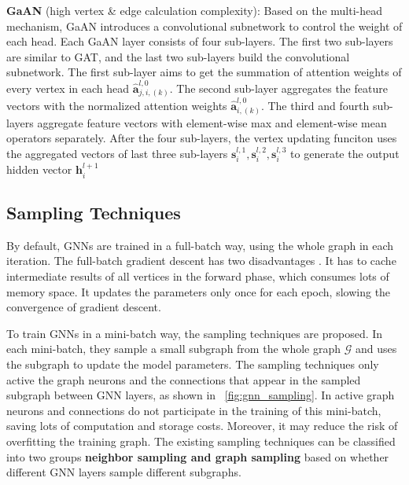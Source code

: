 \textbf{GaAN} (high vertex \& edge calculation complexity):
Based on the multi-head mechanism, GaAN \cite{zhang2018_gaan} introduces a convolutional subnetwork to control the weight of each head.
Each GaAN layer consists of four sub-layers. The first two sub-layers are similar to GAT, and the last two sub-layers build the convolutional subnetwork.
The first sub-layer aims to get the summation of attention weights of every vertex in each head $\boldsymbol{\hat{a}}^{l,0}_{j, i, (k)}$.
The second sub-layer aggregates the feature vectors with the normalized attention weights $\boldsymbol{\hat{a}}^{l,0}_{i,(k)}$.
The third and fourth sub-layers aggregate feature vectors with element-wise max and element-wise mean operators separately.
After the four sub-layers, the vertex updating funciton uses the aggregated vectors of last three sub-layers $\boldsymbol{s}^{l, 1}_i, \boldsymbol{s}^{l, 2}_i, \boldsymbol{s}^{l, 3}_i$ to generate the output hidden vector $\boldsymbol{h}^{l+1}_i$

\subsection{Sampling Techniques}

By default, GNNs are trained in a full-batch way, using the whole graph in each iteration.
The full-batch gradient descent has two disadvantages \cite{chiang2019_cluster_gcn}.
It has to cache intermediate results of all vertices in the forward phase, which consumes lots of memory space.
It updates the parameters only once for each epoch, slowing the convergence of gradient descent.

To train GNNs in a mini-batch way, the sampling techniques are proposed.
In each mini-batch, they sample a small subgraph from the whole graph $\mathcal{G}$ and uses the subgraph to update the model parameters.
The sampling techniques only active the graph neurons and the connections that appear in the sampled subgraph between GNN layers, as shown in \figurename~\ref{fig:gnn_sampling}.
In active graph neurons and connections do not participate in the training of this mini-batch, saving lots of computation and storage costs.
Moreover, it may reduce the risk of overfitting the training graph.
The existing sampling techniques can be classified into two groups \textbf{neighbor sampling and graph sampling} based on whether different GNN layers sample different subgraphs.


